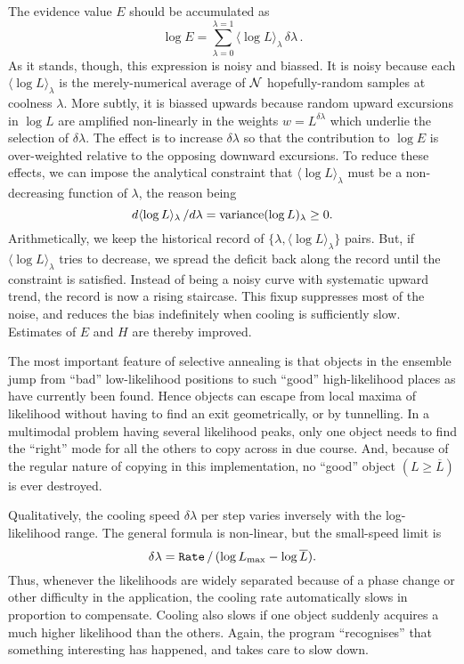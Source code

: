 The evidence value $E$ should be accumulated as 
$$
 \log E = \sum_{\lambda=0}^{\lambda=1} \langle \log L \rangle_\lambda\,\delta\lambda\,.
$$
As it stands, though, this expression is noisy and biassed.
It is noisy because each $\langle \log L \rangle_\lambda$ is the merely-numerical average of $\cal N$  hopefully-random samples at coolness $\lambda$.
More subtly, it is biassed upwards because random upward excursions in $\log L$ are amplified non-linearly in the weights $w = L^{\delta\lambda}$ 
which underlie the selection of $\delta\lambda$.
The effect is to increase $\delta\lambda$ so that the contribution to $\log E$ is over-weighted relative to the opposing downward excursions.
To reduce these effects, we can impose the analytical constraint that $\langle \log L \rangle_\lambda$ must be a non-decreasing function of $\lambda$,
the reason being
$$
 d\langle \log L \rangle_\lambda\,/d\lambda = {\rm variance}(\log L)_\lambda \ge 0.
$$
Arithmetically, we keep the historical record of $\{\lambda,\langle \log L \rangle_\lambda\}$ pairs.
But, if $\langle \log L \rangle_\lambda$ tries to decrease, we spread the deficit back along the record until the constraint is satisfied.
Instead of being a noisy curve with systematic upward trend, the record is now a rising staircase.
This fixup suppresses most of the noise, and reduces the bias indefinitely when cooling is sufficiently slow.
Estimates of $E$ and $H$ are thereby improved.

\bigskip
{}
\smallskip

The most important feature of selective annealing is that objects in the ensemble jump from ``bad'' low-likelihood positions 
to such ``good'' high-likelihood places as have currently been found.
Hence objects can escape from local maxima of likelihood without having to find an exit geometrically, or by tunnelling.
In a multimodal problem having several likelihood peaks, only one object needs to find the ``right'' mode for all the others to copy across in due course.
And, because of the regular nature of copying in this implementation, no ``good'' object $(L \ge \overline L)$ is ever destroyed.

Qualitatively, the cooling speed $\delta\lambda$ per step varies inversely with the log-likelihood range.  
The general formula is non-linear, but the small-speed limit is
$$
    \delta\lambda = {\tt Rate} \,/\, (\log L_{\rm max} - \log \overline L).
$$
Thus, whenever the likelihoods are widely separated because of a phase change or other difficulty in the application, 
the cooling rate automatically slows in proportion to compensate.  
Cooling also slows if one object suddenly acquires a much higher likelihood than the others.
Again, the program ``recognises'' that something interesting has happened, and takes care to slow down.

